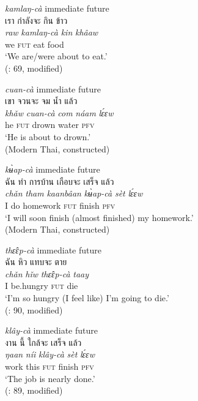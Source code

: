 \documentclass[output=paper,colorlinks,citecolor=brown]{langscibook}
\begin{document}
\ea \label{ex:8}
    \ea \label{ex:8a} \textit{kamlaŋ-cà} immediate future\\
        \textthai{เรา} \textthai{กำลังจะ} \textthai{กิน} \textthai{ข้าว}\\
        \gll \textit{raw} \textit{kamlaŋ-cà} \textit{kin} \textit{khâaw}\\
        we \textsc{fut} eat food\\
        \glt ‘We are/were about to eat.’ \\
        \hfill (\cite{Smyth2002}: 69, modified)
    
    \ex \label{ex:8b} \textit{cuan-cà} immediate future\\
        \textthai{เขา} \textthai{จวนจะ} \textthai{จม} \textthai{น้ำ} \textthai{แล้ว}\\
        \gll \textit{khǎw} \textit{cuan-cà} \textit{com} \textit{náam} \textit{lɛ́ɛw}\\
        he \textsc{fut} drown water \textsc{pfv}\\
        \glt ‘He is about to drown.’ \\
        \hfill (Modern Thai, constructed)
    
    \ex \label{ex:8c} \textit{kʉ̀ap-cà} immediate future\\
        \textthai{ฉัน} \textthai{ทำ} \textthai{การบ้าน} \textthai{เกือบจะ} \textthai{เสร็จ} \textthai{แล้ว}\\
        \gll \textit{chǎn} \textit{tham} \textit{kaanbâan} \textit{kʉ̀ap-cà} \textit{sèt} \textit{lɛ́ɛw}\\
        I do homework \textsc{fut} finish \textsc{pfv}\\
        \glt ‘I will soon finish (almost finished) my homework.’ \\
        \hfill (Modern Thai, constructed)
    
    \ex \label{ex:8d} \textit{thɛ̂ɛp-cà} immediate future\\
        \textthai{ฉัน} \textthai{หิว} \textthai{แทบจะ} \textthai{ตาย}\\
        \gll \textit{chǎn} \textit{hǐw} \textit{thɛ̂ɛp-cà} \textit{taay}\\
        I be.hungry \textsc{fut} die\\
        \glt ‘I’m so hungry (I feel like) I’m going to die.’ \\
        \hfill (\cite{HigbieThinsan2002}: 90, modified)
    
    \ex \label{ex:8e} \textit{klây-cà} immediate future\\
        \textthai{งาน} \textthai{นี้} \textthai{ใกล้จะ} \textthai{เสร็จ} \textthai{แล้ว}\\
        \gll \textit{ŋaan} \textit{níi} \textit{klây-cà} \textit{sèt} \textit{lɛ́ɛw}\\
        work this \textsc{fut} finish \textsc{pfv}\\
        \glt ‘The job is nearly done.’ \\
        \hfill (\cite{HigbieThinsan2002}: 89, modified)
    \z
\z
\end{document}
